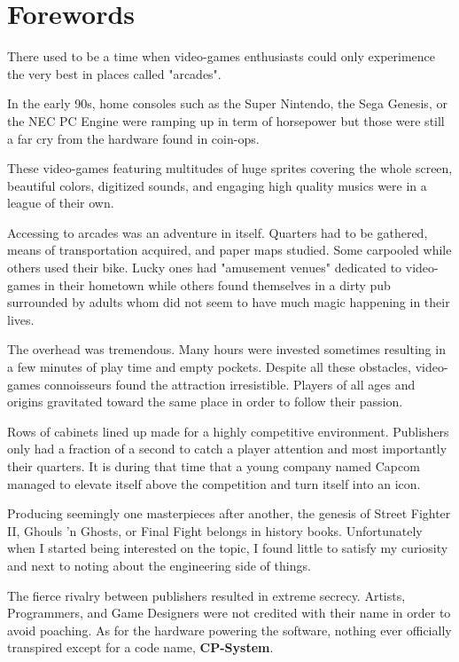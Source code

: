 \chapter*{Forewords}

There used to be a time when video-games enthusiasts could only experimence the very best in places called "arcades". 

In the early 90s, home consoles such as the Super Nintendo, the Sega Genesis, or the NEC PC Engine were ramping up in term of horsepower but those were still a far cry from the hardware found in coin-ops.

These video-games featuring multitudes of huge sprites covering the whole screen, beautiful colors, digitized sounds, and engaging high quality musics were in a league of their own.

Accessing to arcades was an adventure in itself. Quarters had to be gathered, means of transportation acquired, and paper maps studied. Some carpooled while others used their bike. Lucky ones had "amusement venues" dedicated to video-games in their hometown while others found themselves in a dirty pub surrounded by adults whom did not seem to have much magic happening in their lives. 

The overhead was tremendous. Many hours were invested sometimes resulting in a few minutes of play time and empty pockets. Despite all these obstacles, video-games connoisseurs found the attraction irresistible. Players of all ages and origins gravitated toward the same place in order to follow their passion. 

Rows of cabinets lined up made for a highly competitive environment. Publishers only had a fraction of a second to catch a player attention and most importantly their quarters. It is during that time that a young company named Capcom  managed to elevate itself above the competition and turn itself into an icon.

Producing seemingly one masterpieces after another, the genesis of Street Fighter II, Ghouls 'n Ghosts, or Final Fight belongs in history books. Unfortunately when I started being interested on the topic, I found little to satisfy my curiosity and next to noting about the engineering side of things. 

The fierce rivalry between publishers resulted in extreme secrecy. Artists, Programmers, and Game Designers were not credited with their name in order to avoid poaching. As for the hardware powering the software, nothing ever officially transpired except for a code name, \textbf{CP-System}.

